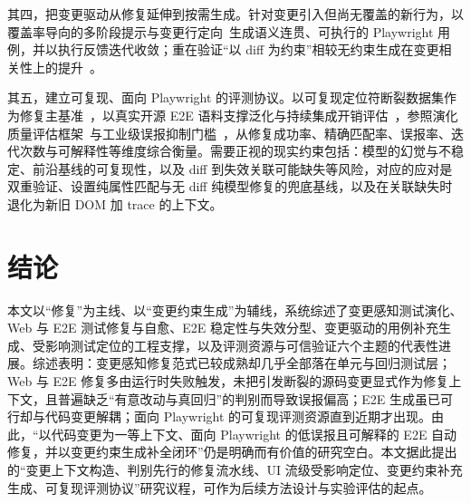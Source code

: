 \documentclass[11pt,a4paper]{article}
\begin{document}
其四，把变更驱动从修复延伸到按需生成。针对变更引入但尚无覆盖的新行为，以覆盖率导向的多阶段提示与变更行定向~\cite{symprompt,chaco}生成语义连贯、可执行的 Playwright 用例，并以执行反馈迭代收敛；重在验证“以 diff 为约束”相较无约束生成在变更相关性上的提升~\cite{autoe2e}。

其五，建立可复现、面向 Playwright 的评测协议。以可复现定位符断裂数据集作为修复主基准~\cite{reprobreak}，以真实开源 E2E 语料支撑泛化与持续集成开销评估~\cite{e2egit}，参照演化质量评估框架~\cite{evalevolution}与工业级误报抑制门槛~\cite{testgenllm}，从修复成功率、精确匹配率、误报率、迭代次数与可解释性等维度综合衡量。需要正视的现实约束包括：模型的幻觉与不稳定、前沿基线的可复现性，以及 diff 到失效关联可能缺失等风险，对应的应对是双重验证、设置纯属性匹配与无 diff 纯模型修复的兜底基线，以及在关联缺失时退化为新旧 DOM 加 trace 的上下文。

\section{结论}

本文以“修复”为主线、以“变更约束生成”为辅线，系统综述了变更感知测试演化、Web 与 E2E 测试修复与自愈、E2E 稳定性与失效分型、变更驱动的用例补充生成、受影响测试定位的工程支撑，以及评测资源与可信验证六个主题的代表性进展。综述表明：变更感知修复范式已较成熟却几乎全部落在单元与回归测试层；Web 与 E2E 修复多由运行时失败触发，未把引发断裂的源码变更显式作为修复上下文，且普遍缺乏“有意改动与真回归”的判别而导致误报偏高；E2E 生成虽已可行却与代码变更解耦；面向 Playwright 的可复现评测资源直到近期才出现。由此，“以代码变更为一等上下文、面向 Playwright 的低误报且可解释的 E2E 自动修复，并以变更约束生成补全闭环”仍是明确而有价值的研究空白。本文据此提出的“变更上下文构造、判别先行的修复流水线、UI 流级受影响定位、变更约束补充生成、可复现评测协议”研究议程，可作为后续方法设计与实验评估的起点。



\end{document}
